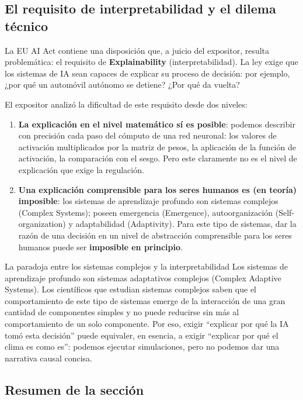 \documentclass[a4paper]{article}
\begin{document}
\subsection{El requisito de interpretabilidad y el dilema técnico}

La EU AI Act contiene una disposición que, a juicio del expositor, resulta problemática: el requisito de \textbf{Explainability} (interpretabilidad). La ley exige que los sistemas de IA sean capaces de explicar su proceso de decisión: por ejemplo, ¿por qué un automóvil autónomo se detiene? ¿Por qué da vuelta?

El expositor analizó la dificultad de este requisito desde dos niveles:

\begin{enumerate}
    \item \textbf{La explicación en el nivel matemático sí es posible}: podemos describir con precisión cada paso del cómputo de una red neuronal: los valores de activación multiplicados por la matriz de pesos, la aplicación de la función de activación, la comparación con el sesgo. Pero este claramente no es el nivel de explicación que exige la regulación.
    \item \textbf{Una explicación comprensible para los seres humanos es (en teoría) imposible}: los sistemas de aprendizaje profundo son sistemas complejos (Complex Systems); poseen emergencia (Emergence), autoorganización (Self-organization) y adaptabilidad (Adaptivity). Para este tipo de sistemas, dar la razón de una decisión en un nivel de abstracción comprensible para los seres humanos puede ser \textbf{imposible en principio}.
\end{enumerate}

\begin{importantbox}{La paradoja entre los sistemas complejos y la interpretabilidad}
Los sistemas de aprendizaje profundo son sistemas adaptativos complejos (Complex Adaptive Systems). Los científicos que estudian sistemas complejos saben que el comportamiento de este tipo de sistemas emerge de la interacción de una gran cantidad de componentes simples y no puede reducirse sin más al comportamiento de un solo componente. Por eso, exigir ``explicar por qué la IA tomó esta decisión'' puede equivaler, en esencia, a exigir ``explicar por qué el clima es como es'': podemos ejecutar simulaciones, pero no podemos dar una narrativa causal concisa.
\end{importantbox}

\subsection{Resumen de la sección}
\end{document}
